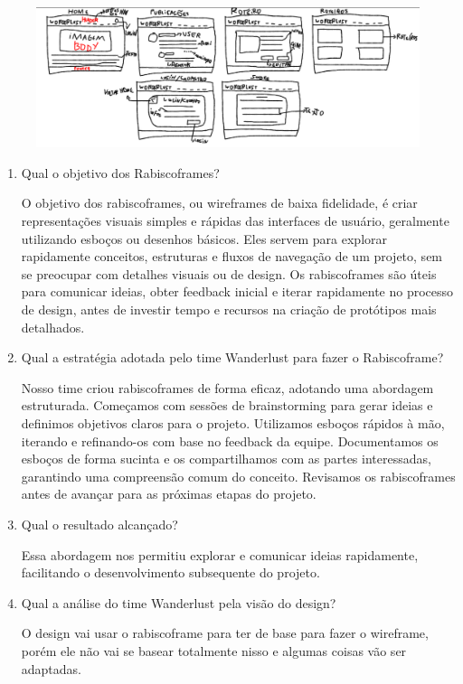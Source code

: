 \documentclass{article}
\begin{document}
\begin{figure}[H]
      \centering
      \includegraphics [width=1\textwidth]{IMGDOC/RabiscoFrame.png}
      \label{RabiscoFrame}
\end{figure}

\begin{enumerate}
      \item Qual o objetivo dos Rabiscoframes?

            O objetivo dos rabiscoframes, ou wireframes de baixa fidelidade, é criar representações visuais simples e rápidas das interfaces de usuário, geralmente utilizando esboços ou desenhos básicos. Eles servem para explorar rapidamente conceitos, estruturas e fluxos de navegação de um projeto, sem se preocupar com detalhes visuais ou de design. Os rabiscoframes são úteis para comunicar ideias, obter feedback inicial e iterar rapidamente no processo de design, antes de investir tempo e recursos na criação de protótipos mais detalhados.

      \item Qual a estratégia adotada pelo time Wanderlust para fazer o Rabiscoframe?

            Nosso time criou rabiscoframes de forma eficaz, adotando uma abordagem estruturada. Começamos com sessões de brainstorming para gerar ideias e definimos objetivos claros para o projeto. Utilizamos esboços rápidos à mão, iterando e refinando-os com base no feedback da equipe. Documentamos os esboços de forma sucinta e os compartilhamos com as partes interessadas, garantindo uma compreensão comum do conceito. Revisamos os rabiscoframes antes de avançar para as próximas etapas do projeto.

      \item Qual o resultado alcançado?

            Essa abordagem nos permitiu explorar e comunicar ideias rapidamente, facilitando o desenvolvimento subsequente do projeto.

      \item Qual a análise do time Wanderlust pela visão do design?

            O design vai usar o rabiscoframe para ter de base para fazer o wireframe, porém ele não vai se basear totalmente nisso e algumas coisas vão ser adaptadas.

\end{enumerate}
\end{document}
